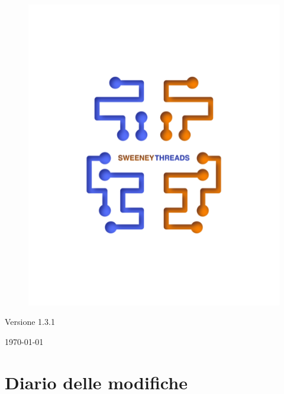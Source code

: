 \documentclass[a4paper]{article}
\begin{document}
\begin{titlepage}
		\begin{figure}[H]
		\centering
			\includegraphics[scale=0.8]{sweeney.png}
		\end{figure}
		\begin{center}
			Versione 1.3.1
		\end{center}
		{\large \today}\\[3cm] 
		\vfill  
	\end{titlepage}
	
	\newpage
	\section*{Diario delle modifiche}
	
	\newpage
\end{document}
